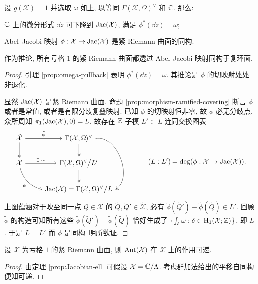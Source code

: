 \begin{theorem}\label{prop:Jacobian-ell}
	设 $g(\mathcal{X}) = 1$ 并选取 $\omega$ 如上, 以等同 $\Gamma(\mathcal{X}, \Omega)^\vee$ 和 $\mathbb{C}$. 那么:
	\begin{compactitem}
		\item $\mathbb{C}$ 上的微分形式 $\dd z$ 可下降到 $\operatorname{Jac}(\mathcal{X})$, 满足 $\phi^*(\dd z) = \omega$;
		\item Abel--Jacobi 映射 $\phi: \mathcal{X} \to \operatorname{Jac}(\mathcal{X})$ 是紧 Riemann 曲面的同构.
	\end{compactitem}
	作为推论, 所有亏格 $1$ 的紧 Riemann 曲面都透过 Abel--Jacobi 映射同构于复环面.
\end{theorem}
\begin{proof}
	引理 \ref{prop:omega-pullback} 表明 $\phi^*(\dd z) = \omega$. 其推论是 $\phi$ 的切映射处处非退化.
	
	显然 $\operatorname{Jac}(\mathcal{X})$ 是紧 Riemann 曲面. 命题 \ref{prop:morphism-ramified-covering} 断言 $\phi$ 或者是常值, 或者是有限分歧复叠映射. 已知 $\phi$ 的切映射恒非零, 故 $\phi$ 必无分歧点. 众所周知 $\pi_1(\operatorname{Jac}(\mathcal{X}), 0) = L$, 故存在 $\mathbb{Z}$-子模 $L' \subset L$ 连同交换图表
	\[\begin{tikzcd}
		\tilde{\mathcal{X}} \arrow[r, "\tilde{\phi}"] \arrow[twoheadrightarrow, d] & \Gamma(\mathcal{X}, \Omega)^\vee \arrow[twoheadrightarrow, d] \arrow[twoheadrightarrow, dd, bend left=80, start anchor=east, end anchor=east] \\
		\mathcal{X} \arrow[rd, bend right, "\phi"', end anchor=west] \arrow[r, "\exists\; \sim"] & \Gamma(\mathcal{X}, \Omega)^\vee \big/ L' \arrow[twoheadrightarrow, d] \\
		& \Jac(\mathcal{X}) = \Gamma(\mathcal{X}, \Omega)^\vee \big/ L
	\end{tikzcd} \qquad (L:L') = \deg(\phi: \mathcal{X} \to \Jac(\mathcal{X}) ). \]
	上图蕴涵对于映至同一点 $Q \in \mathcal{X}$ 的 $\tilde{Q}, \tilde{Q}' \in \tilde{\mathcal{X}}$, 必有 $\tilde{\phi}(\tilde{Q}') - \tilde{\phi}(\tilde{Q}) \in L'$. 回顾 $\tilde{\phi}$ 的构造可知所有这些 $\tilde{\phi}(\tilde{Q}') - \tilde{\phi}(\tilde{Q})$ 恰好生成了 $\left\{ \int_\delta \omega : \delta \in \operatorname{H}_1(\mathcal{X}; \mathbb{Z}) \right\}$, 即 $L$. 于是 $L = L'$ 而 $\phi$ 是同构. 明所欲证.
\end{proof}

\begin{corollary}\label{prop:genus-1-transitive}
	设 $\mathcal{X}$ 为亏格 $1$ 的紧 Riemann 曲面, 则 $\operatorname{Aut}(\mathcal{X})$ 在 $\mathcal{X}$ 上的作用可递.
\end{corollary}
\begin{proof}
	由定理 \ref{prop:Jacobian-ell} 可假设 $\mathcal{X} = \mathbb{C}/\Lambda$. 考虑群加法给出的平移自同构便知可递.
\end{proof}

